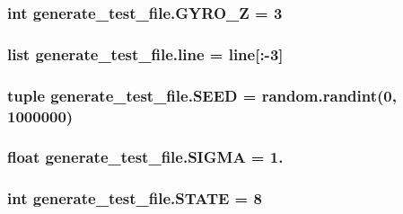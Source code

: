 \hypertarget{namespacegenerate__test__file_ad6bedebfe072e60e788572c7d64e1e64}{
\subsubsection[{G\-Y\-R\-O\-\_\-\-Z}]{\setlength{\rightskip}{0pt plus 5cm}int generate\-\_\-test\-\_\-file.\-G\-Y\-R\-O\-\_\-\-Z = 3}}\label{namespacegenerate__test__file_ad6bedebfe072e60e788572c7d64e1e64}
\hypertarget{namespacegenerate__test__file_ade66fab6904c7b63ae363d004a9dd251}{
\subsubsection[{line}]{\setlength{\rightskip}{0pt plus 5cm}list generate\-\_\-test\-\_\-file.\-line = line\mbox{[}\-:-\/3\mbox{]}}}\label{namespacegenerate__test__file_ade66fab6904c7b63ae363d004a9dd251}
\hypertarget{namespacegenerate__test__file_a73a2892e699ae640f1fd7262c74fa733}{
\subsubsection[{S\-E\-E\-D}]{\setlength{\rightskip}{0pt plus 5cm}tuple generate\-\_\-test\-\_\-file.\-S\-E\-E\-D = random.\-randint(0, 1000000)}}\label{namespacegenerate__test__file_a73a2892e699ae640f1fd7262c74fa733}
\hypertarget{namespacegenerate__test__file_a34a98faa00c665c3cc688ef6d170b3c0}{
\subsubsection[{S\-I\-G\-M\-A}]{\setlength{\rightskip}{0pt plus 5cm}float generate\-\_\-test\-\_\-file.\-S\-I\-G\-M\-A = 1.}}\label{namespacegenerate__test__file_a34a98faa00c665c3cc688ef6d170b3c0}
\hypertarget{namespacegenerate__test__file_a9ec6da862c40cd9158e10d93512b24b7}{
\subsubsection[{S\-T\-A\-T\-E}]{\setlength{\rightskip}{0pt plus 5cm}int generate\-\_\-test\-\_\-file.\-S\-T\-A\-T\-E = 8}}\label{namespacegenerate__test__file_a9ec6da862c40cd9158e10d93512b24b7}
